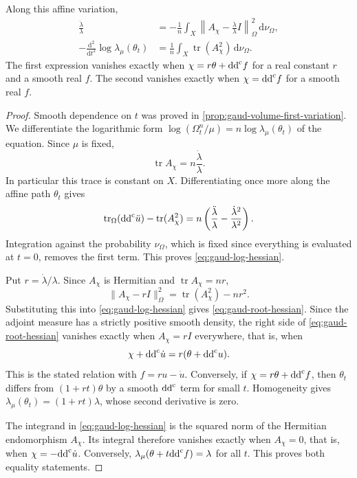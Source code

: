 \begin{proposition}\label{prop:gaud-volume-hessian}
Along this affine variation,
\begin{align}
 \frac{\ddot\lambda}{\lambda}
   &=-\frac1n\int_X
      \left\|A_\chi-\frac{\dot\lambda}{\lambda}I\right\|_\Omega^2
                                      \,\mathrm{d}\nu_\Omega,\label{eq:gaud-root-hessian}\\
 -\frac{\mathrm{d}^2}{\mathrm{d}t^2}\log\lambda_\mu(\theta_t)
   &=\frac1n\int_X\operatorname{tr}(A_\chi^2)\,\mathrm{d}\nu_\Omega.
                                      \label{eq:gaud-log-hessian}
\end{align}
The first expression vanishes exactly when
$\chi=r\theta+\mathrm{dd}^{\mathrm{c}} f$ for a real constant $r$ and a smooth real $f$.
The second vanishes exactly when $\chi=\mathrm{dd}^{\mathrm{c}} f$ for a smooth real $f$.
\end{proposition}
\begin{proof}
Smooth dependence on $t$ was proved in \cref{prop:gaud-volume-first-variation}. We differentiate the logarithmic form $\log(\Omega_t^n/\mu)=n\log\lambda_\mu(\theta_t)$ of the equation. Since $\mu$ is fixed,
\[
 \operatorname{tr}A_\chi=n\frac{\dot\lambda}{\lambda}.
\]
In particular this trace is constant on $X$. Differentiating once more along the affine path $\theta_t$ gives
\[
 \operatorname{tr}_\Omega(\mathrm{dd}^{\mathrm{c}}\ddot u)
       -\operatorname{tr}(A_\chi^2)
   =n\left(\frac{\ddot\lambda}{\lambda}
                  -\frac{\dot\lambda^2}{\lambda^2}\right).
\]
Integration against the probability $\nu_\Omega$, which is fixed since everything is evaluated at $t=0$, removes the first term. This proves \eqref{eq:gaud-log-hessian}.

Put $r=\dot\lambda/\lambda$. Since $A_\chi$ is Hermitian and $\operatorname{tr}A_\chi=nr$,
\[
 \|A_\chi-rI\|_\Omega^2
      =\operatorname{tr}(A_\chi^2)-nr^2.
\]
Substituting this into \eqref{eq:gaud-log-hessian} gives \eqref{eq:gaud-root-hessian}. Since the adjoint measure has a strictly positive smooth density, the right side of \eqref{eq:gaud-root-hessian} vanishes exactly when $A_\chi=rI$ everywhere, that is, when
\[
 \chi+\mathrm{dd}^{\mathrm{c}}\dot u=r(\theta+\mathrm{dd}^{\mathrm{c}} u).
\]
This is the stated relation with $f=ru-\dot u$. Conversely, if $\chi=r\theta+\mathrm{dd}^{\mathrm{c}} f$, then $\theta_t$ differs from $(1+rt)\theta$ by a smooth $\mathrm{dd}^{\mathrm{c}}$ term for small $t$. Homogeneity gives $\lambda_\mu(\theta_t)=(1+rt)\lambda$, whose second derivative is zero.

The integrand in \eqref{eq:gaud-log-hessian} is the squared norm of the Hermitian endomorphism $A_\chi$. Its integral therefore vanishes exactly when $A_\chi=0$, that is, when $\chi=-\mathrm{dd}^{\mathrm{c}}\dot u$. Conversely, $\lambda_\mu(\theta+t\mathrm{dd}^{\mathrm{c}} f)=\lambda$ for all $t$. This proves both equality statements.
\end{proof}

